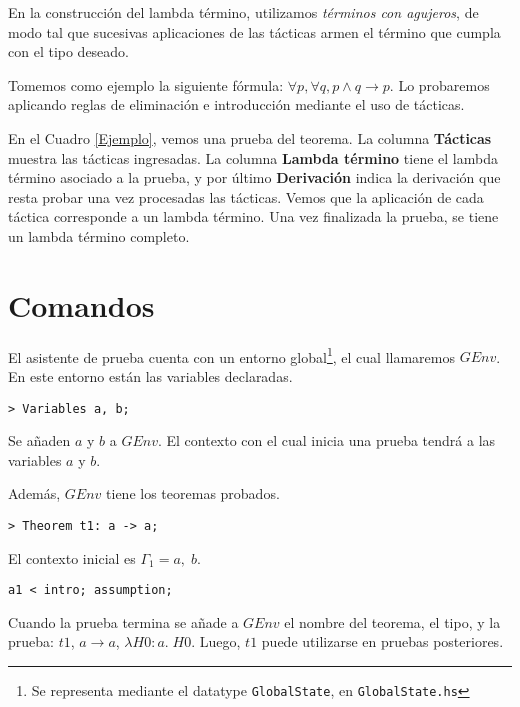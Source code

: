 \documentclass[a4paper,11pt]{article}
\theoremstyle{definition}
\theoremstyle{remark}
\begin{document}
\begin{table}[]
\begin{tabular}{|c|c|c|}
\end{tabular}
\end{table}

En la construcción del lambda término, utilizamos \textit{términos con agujeros}, de modo tal que sucesivas aplicaciones 
de las tácticas armen el término que cumpla con el tipo deseado.

Tomemos como ejemplo la siguiente fórmula: $\forall p, \forall q, p \wedge q \rightarrow p$.
Lo probaremos aplicando reglas de eliminación e introducción mediante el uso de tácticas.

En el Cuadro \ref{Ejemplo}, vemos una prueba del teorema.
La columna \textbf{Tácticas} muestra las tácticas ingresadas. 
La columna \textbf{Lambda término} tiene el lambda término asociado a la prueba, 
y por último \textbf{Derivación} indica la derivación que resta probar una vez procesadas las tácticas.
Vemos que la aplicación de cada táctica corresponde a un lambda término.
Una vez finalizada la prueba, se tiene un lambda término completo.

\section{Comandos}

El asistente de prueba cuenta con un entorno global\footnote{Se representa mediante el datatype \texttt{GlobalState}, 
en \texttt{GlobalState.hs}}, el cual llamaremos $GEnv$.
En este entorno están las variables declaradas.

\begin{verbatim}
> Variables a, b;
\end{verbatim}

Se añaden $a$ y $b$ a $GEnv$. El contexto con el cual inicia una prueba tendrá a las variables $a$ y $b$.

Además, $GEnv$ tiene los teoremas probados.

\begin{verbatim}
> Theorem t1: a -> a;
\end{verbatim}
  
El contexto inicial es $\Gamma_1 = a, \; b$. 

\begin{verbatim}
a1 < intro; assumption;
\end{verbatim}

Cuando la prueba termina se añade a $GEnv$ el nombre del teorema, el tipo, y
la prueba: $t1$, $a \rightarrow a$, $\lambda H0:a. \; H0$.
Luego,  $t1$ puede utilizarse en pruebas posteriores.
\end{document}
